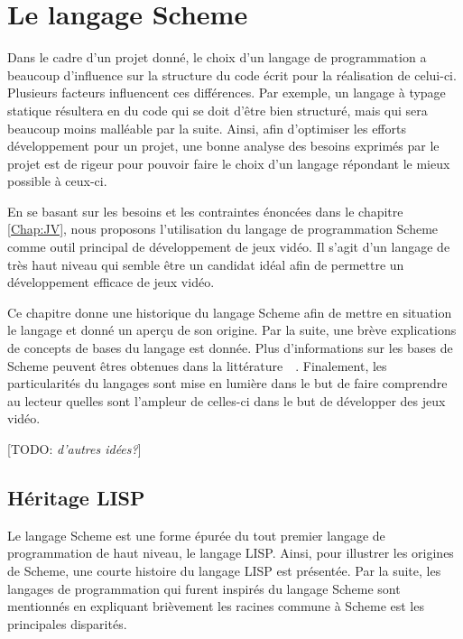 \documentclass[12pt,oneside,letterpaper,francais]{book}
\newcommand{\todo}[1]{[TODO: {\it #1}]}
\begin{document}
\chapter{Le langage Scheme}
\label{Chap:Scheme}

Dans le cadre d'un projet donné, le choix d'un langage de
programmation a beaucoup d'influence sur la structure du code écrit
pour la réalisation de celui-ci. Plusieurs facteurs influencent ces
différences. Par exemple, un langage à typage statique résultera en du
code qui se doit d'être bien structuré, mais qui sera beaucoup moins
malléable par la suite. Ainsi, afin d'optimiser les efforts
développement pour un projet, une bonne analyse des besoins exprimés
par le projet est de rigeur pour pouvoir faire le choix d'un langage
répondant le mieux possible à ceux-ci.

En se basant sur les besoins et les contraintes énoncées dans le
chapitre \ref{Chap:JV}, nous proposons l'utilisation du langage de
programmation Scheme comme outil principal de développement de jeux
vidéo. Il s'agit d'un langage de très haut niveau qui semble être un
candidat idéal afin de permettre un développement efficace de jeux
vidéo. 

Ce chapitre donne une historique du langage Scheme afin de mettre en
situation le langage et donné un aperçu de son origine. Par la suite,
une brève explications de concepts de bases du langage est
donnée. Plus d'informations sur les bases de Scheme peuvent êtres
obtenues dans la littérature~\cite{R5RS}~\cite{SICP}. Finalement, les
particularités du langages sont mise en lumière dans le but de faire
comprendre au lecteur quelles sont l'ampleur de celles-ci dans le but
de développer des jeux vidéo.

\todo{d'autres idées?}

\section{Héritage LISP}
\label{Scheme:hist}

Le langage Scheme est une forme épurée du tout premier langage de
programmation de haut niveau, le langage LISP. Ainsi, pour illustrer
les origines de Scheme, une courte histoire du langage LISP est
présentée. Par la suite, les langages de programmation qui furent
inspirés du langage Scheme sont mentionnés en expliquant brièvement
les racines commune à Scheme est les principales disparités.
\end{document}
